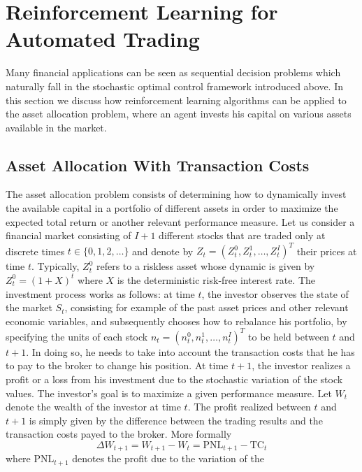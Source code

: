 \section{Reinforcement Learning for Automated Trading}
\label{sec:application_to_systematic_trading}

Many financial applications can be seen as sequential decision problems which naturally fall in the stochastic optimal control framework introduced above. In this section we discuss how reinforcement learning algorithms can be applied to the asset allocation problem, where an agent invests his capital on various assets available in the market.  

\subsection{Asset Allocation With Transaction Costs} 
The asset allocation problem consists of determining how to dynamically invest the available capital in a portfolio of different assets in order to maximize the expected total return or another relevant performance measure. Let us consider a financial market consisting of $I+1$ different stocks that are traded only at discrete times $t \in \{0, 1, 2, \ldots\}$ and denote by ${Z}_t = {(Z_t^0, Z_t^1, \ldots, Z_t^I)}^T$ their prices at time $t$. Typically, $Z_t^0$ refers to a riskless asset whose dynamic is given by $Z_t^0 = {(1 + X)}^t$ where $X$ is the deterministic risk-free interest rate. The investment process works as follows: at time $t$, the investor observes the
state of the market $S_t$, consisting for example of the past asset prices and other relevant economic variables, and subsequently chooses how to rebalance his portfolio, by specifying the units of each stock ${n}_t = {(n_t^0 , n_t^1 , \ldots , n_t^I)}^T$ to be held between $t$ and $t+1$. In doing so, he needs to take into account the transaction costs that he has to pay to the broker to change his position.  At time $t+1$, the investor realizes a profit or a loss from his investment due to the stochastic variation of the stock values. The investor’s goal is to maximize a given performance measure. Let $W_t$ denote the wealth of the investor at time $t$. The profit realized between $t$ and $t+1$ is simply given by the difference between the trading results and the transaction costs payed to the broker. More formally
\begin{equation*}
	\Delta W_{t+1} = W_{t+1} - W_t = \text{PNL}_{t+1} - \text{TC}_{t}	
\end{equation*}
where $\text{PNL}_{t+1}$ denotes the profit due to the variation of the

